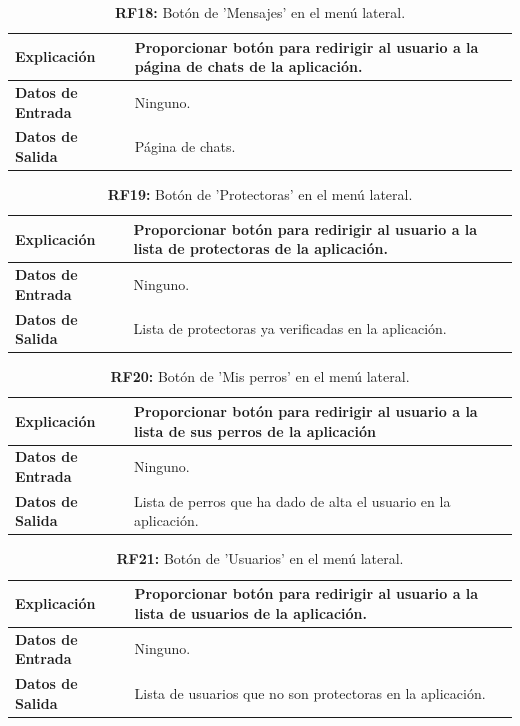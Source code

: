 \documentclass[a4paper, 12pt]{article}
\begin{document}
\begin{table}[H]
\captionsetup{justification=raggedright,singlelinecheck=false}
\caption{\textbf{RF18:} Botón de 'Mensajes' en el menú lateral.}
\label{tab:RF18}
	\begin{tabular}{|m{5cm}|m{10cm}|}
	\hline
	\textbf{Explicación} & Proporcionar botón para redirigir al usuario a la página de chats de la aplicación. \\ 
	\hline
	\textbf{Datos de Entrada} &  Ninguno. \\ 
	\hline
	\textbf{Datos de Salida} &  Página de chats. \\ 
	\hline
\end{tabular}
\end{table}

\begin{table}[H]
\captionsetup{justification=raggedright,singlelinecheck=false}
\caption{\textbf{RF19:} Botón de 'Protectoras' en el menú lateral.}
\label{tab:RF19}
	\begin{tabular}{|m{5cm}|m{10cm}|}
	\hline
	\textbf{Explicación} & Proporcionar botón para redirigir al usuario a la lista de protectoras de la aplicación. \\ 
	\hline
	\textbf{Datos de Entrada} &  Ninguno. \\ 
	\hline
	\textbf{Datos de Salida} &  Lista de protectoras ya verificadas en la aplicación. \\ 
	\hline
\end{tabular}
\end{table}

\begin{table}[H]
\captionsetup{justification=raggedright,singlelinecheck=false}
\caption{\textbf{RF20:} Botón de 'Mis perros' en el menú lateral.}
\label{tab:RF20}
	\begin{tabular}{|m{5cm}|m{10cm}|}
	\hline
	\textbf{Explicación} & Proporcionar botón para redirigir al usuario a la lista de sus perros de la aplicación \\ 
	\hline
	\textbf{Datos de Entrada} &  Ninguno. \\ 
	\hline
	\textbf{Datos de Salida} &  Lista de perros que ha dado de alta el usuario en la aplicación. \\ 
	\hline
\end{tabular}
\end{table}

\begin{table}[H]
\captionsetup{justification=raggedright,singlelinecheck=false}
\caption{\textbf{RF21:} Botón de 'Usuarios' en el menú lateral.}
\label{tab:RF21}
	\begin{tabular}{|m{5cm}|m{10cm}|}
	\hline
	\textbf{Explicación} & Proporcionar botón para redirigir al usuario a la lista de usuarios de la aplicación. \\ 
	\hline
	\textbf{Datos de Entrada} &  Ninguno. \\ 
	\hline
	\textbf{Datos de Salida} &  Lista de usuarios que no son protectoras en la aplicación. \\ 
	\hline
\end{tabular}
\end{table}
\end{document}

